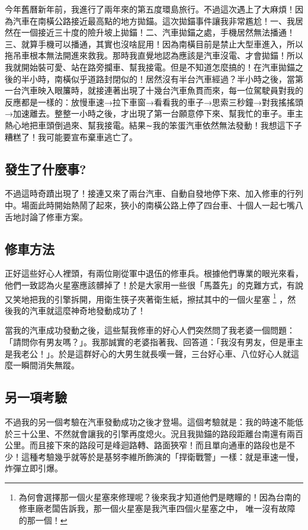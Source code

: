 今年舊曆新年前，我進行了兩年來的第五度環島旅行。不過這次遇上了大麻煩！因為汽車在南橫公路接近最高點的地方拋錨。這次拋錨事件讓我非常尷尬！一、我居然在一個接近三十度的險升坡上拋錨！二、汽車拋錨之處，手機居然無法播通！三、就算手機可以播通，其實也沒啥屁用！因為南橫目前是禁止大型車進入，所以拖吊車根本無法開進來救我。那時我直覺地認為應該是汽車沒電、才會拋錨！所以我就開始裝可愛、站在路旁攔車、幫我接電。但是不知道怎麼搞的！在汽車拋錨之後的半小時，南橫似乎道路封閉似的！居然沒有半台汽車經過？半小時之後，當第一台汽車映入眼簾時，就接連著出現了十幾台汽車魚貫而來，每一位駕駛員對我的反應都是一樣的：放慢車速→拉下車窗→看看我的車子→思索三秒鐘→對我搖搖頭→加速離去。整整一小時之後，才出現了第一台願意停下來、幫我忙的車子。車主熱心地把車頭倒過來、幫我接電。結果∼我的笨蛋汽車依然無法發動！我想這下子糟糕了！我可能要宣布棄車逃亡了。

\subsection{發生了什麼事?}
不過這時奇蹟出現了！接連又來了兩台汽車、自動自發地停下來、加入修車的行列中。場面此時開始熱鬧了起來，狹小的南橫公路上停了四台車、十個人一起七嘴八舌地討論了修車方案。

\subsection{修車方法}
正好這些好心人裡頭，有兩位剛從軍中退伍的修車兵。根據他們專業的眼光來看，他們一致認為火星塞應該髒掉了！於是大家用一些很「馬蓋先」的克難方式，有說又笑地把我的引擎拆開，用衛生筷子夾著衛生紙，擦拭其中的一個火星塞%
\footnote{為何會選擇那一個火星塞來修理呢？後來我才知道他們是瞎矇的！因為台南的修車廠老闆告訴我，那一個火星塞是我汽車四個火星塞之中，
唯一沒有故障的那一個！}%
，然後我的汽車就這麼神奇地發動成功了！

 當我的汽車成功發動之後，這些幫我修車的好心人們突然問了我老婆一個問題：「請問你有男友嗎？」。我那誠實的老婆指著我、回答道：「我沒有男友，但是車主是我老公！」。於是這群好心的大男生就長嘆一聲，三台好心車、八位好心人就這麼一瞬間消失無蹤。
 
\subsection{另一項考驗}
不過我的另一個考驗在汽車發動成功之後才登場。這個考驗就是：我的時速不能低於三十公里、不然就會讓我的引擎再度熄火。況且我拋錨的路段距離台南還有兩百公里。而且接下來的路段可是峰迴路轉、路面狹窄！而且單向通車的路段也是不少！這種考驗幾乎就等於是基努李維所飾演的「捍衛戰警」一樣：就是車速一慢，炸彈立即引爆。
 
